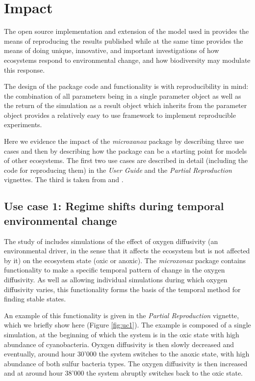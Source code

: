 \documentclass[]{elsarticle} %
\begin{document}
\hypertarget{impact}{%
\section{Impact}\label{impact}}

The open source implementation and extension of the model used in
\citet{Bush2017} provides the means of reproducing the results published
while at the same time provides the means of doing unique, innovative,
and important investigations of how ecosystems respond to environmental
change, and how biodiversity may modulate this response.

The design of the package code and functionality is with reproducibility
in mind: the combination of all parameters being in a single parameter
object as well as the return of the simulation as a result object which
inherits from the parameter object provides a relatively easy to use
framework to implement reproducible experiments.

Here we evidence the impact of the \emph{microxanox} package by
describing three use cases and then by describing how the package can be
a starting point for models of other ecosystems. The first two use cases
are described in detail (including the code for reproducing them) in the
\emph{User Guide} and the \emph{Partial Reproduction} vignettes. The
third is taken from \citet{Limberger2022} and \citet{Petchey2022}.

\hypertarget{use-case-1-regime-shifts-during-temporal-environmental-change}{%
\subsection{Use case 1: Regime shifts during temporal environmental
change}\label{use-case-1-regime-shifts-during-temporal-environmental-change}}

The study of \citet{Bush2017} includes simulations of the effect of
oxygen diffusivity (an environmental driver, in the sense that it
affects the ecosystem but is not affected by it) on the ecosystem state
(oxic or anoxic). The \emph{microxonax} package contains functionality
to make a specific temporal pattern of change in the oxygen diffusivity.
As well as allowing individual simulations during which oxygen
diffusivity varies, this functionality forms the basis of the temporal
method for finding stable states.

An example of this functionality is given in the \emph{Partial
Reproduction} vignette, which we briefly show here (Figure
\ref{fig:uc1}). The example is composed of a single simulation, at the
beginning of which the system is in the oxic state with high abundance
of cyanobacteria. Oyxgen diffusivity is then slowly decreased and
eventually, around hour 30'000 the system switches to the anoxic state,
with high abundance of both sulfur bacteria types. The oxygen
diffusivity is then increased and at around hour 38'000 the system
abruptly switches back to the oxic state.
\end{document}
